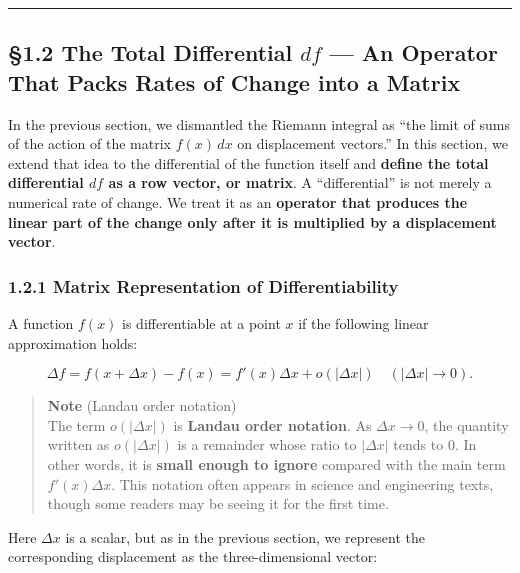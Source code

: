 \begin{center}\rule{0.5\linewidth}{0.5pt}\end{center}

\hypertarget{the-total-differential-df-an-operator-that-packs-rates-of-change-into-a-matrix}{%
\subsection{\texorpdfstring{§1.2 The Total Differential \(df\) --- An
Operator That Packs Rates of Change into a
Matrix}{§1.2 The Total Differential df --- An Operator That Packs Rates of Change into a Matrix}}\label{the-total-differential-df-an-operator-that-packs-rates-of-change-into-a-matrix}}

In the previous section, we dismantled the Riemann integral as ``the
limit of sums of the action of the matrix \(f(x)\,dx\) on displacement
vectors.'' In this section, we extend that idea to the differential of
the function itself and
\textbf{define the total differential $df$ as a row vector, or matrix}.
A ``differential'' is not merely a numerical rate of change. We treat it
as an
\textbf{operator that produces the linear part of the change only after it is multiplied by a displacement vector}.

\hypertarget{matrix-representation-of-differentiability}{%
\subsubsection{1.2.1 Matrix Representation of
Differentiability}\label{matrix-representation-of-differentiability}}

A function \(f(x)\) is differentiable at a point \(x\) if the following
linear approximation holds:

\[
\Delta f = f(x+\Delta x)-f(x)=f'(x)\Delta x+o(|\Delta x|)\quad(|\Delta x|\to0).
\]

\begin{quote}
\textbf{Note} (Landau order notation)\\
The term \(o(|\Delta x|)\) is \textbf{Landau order notation}. As
\(\Delta x\to0\), the quantity written as \(o(|\Delta x|)\) is a
remainder whose ratio to \(|\Delta x|\) tends to \(0\). In other words,
it is \textbf{small enough to ignore} compared with the main term
\(f'(x)\Delta x\). This notation often appears in science and
engineering texts, though some readers may be seeing it for the first
time.
\end{quote}

Here \(\Delta x\) is a scalar, but as in the previous section, we
represent the corresponding displacement as the three-dimensional
vector:

